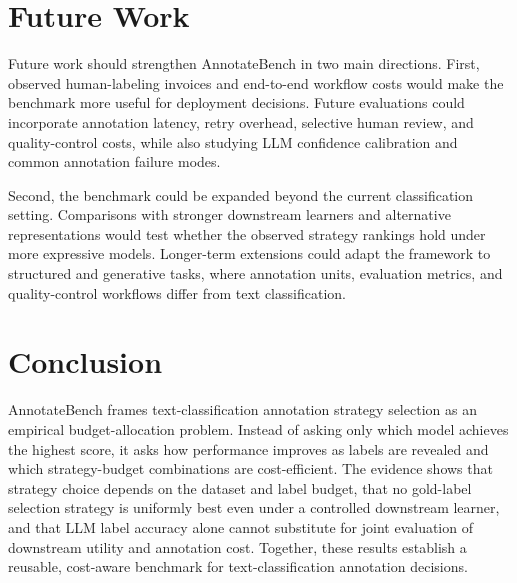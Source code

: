 \documentclass[11pt]{article}
\begin{document}
\section{Future Work}

Future work should strengthen AnnotateBench in two main directions. First, observed human-labeling invoices and end-to-end workflow costs would make the benchmark more useful for deployment decisions. Future evaluations could incorporate annotation latency, retry overhead, selective human review, and quality-control costs, while also studying LLM confidence calibration and common annotation failure modes.

Second, the benchmark could be expanded beyond the current classification setting. Comparisons with stronger downstream learners and alternative representations would test whether the observed strategy rankings hold under more expressive models. Longer-term extensions could adapt the framework to structured and generative tasks, where annotation units, evaluation metrics, and quality-control workflows differ from text classification.

\section{Conclusion}

AnnotateBench frames text-classification annotation strategy selection as an empirical budget-allocation problem. Instead of asking only which model achieves the highest score, it asks how performance improves as labels are revealed and which strategy-budget combinations are cost-efficient. The evidence shows that strategy choice depends on the dataset and label budget, that no gold-label selection strategy is uniformly best even under a controlled downstream learner, and that LLM label accuracy alone cannot substitute for joint evaluation of downstream utility and annotation cost. Together, these results establish a reusable, cost-aware benchmark for text-classification annotation decisions.

\FloatBarrier



\end{document}

